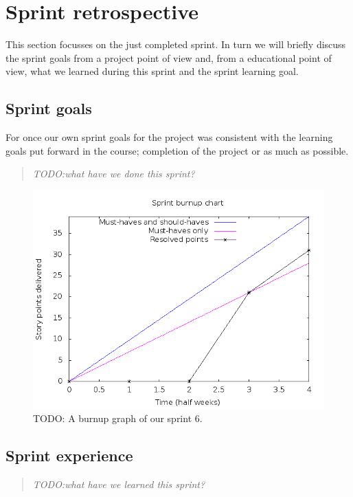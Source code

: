 \documentclass[a4paper,11pt]{article}
\begin{document}
\section{Sprint retrospective}
\label{sec:sprint_retrospective}
This section focusses on the just completed sprint. In turn we will briefly
discuss the sprint goals from a project point of view and, from a educational
point of view, what we learned during this sprint and the sprint learning goal.

\subsection{Sprint goals}
\label{sec:sprint_goals}

For once our own sprint goals for the project was consistent with the learning
goals put forward in the course; completion of the project or as much as
possible. 

\begin{quote}
	\emph{TODO:what have we done this sprint?}
\end{quote}


\begin{figure}[!ht]
	\centering
	\includegraphics[width=12cm]{img/burnup.png}
	\caption{TODO: A burnup graph of our sprint 6.}
	\label{fig:burnup}
\end{figure}

\subsection{Sprint experience}
\label{sec:sprint_experience}
\begin{quote}
	\emph{TODO:what have we learned this sprint?}
\end{quote}
\end{document}

